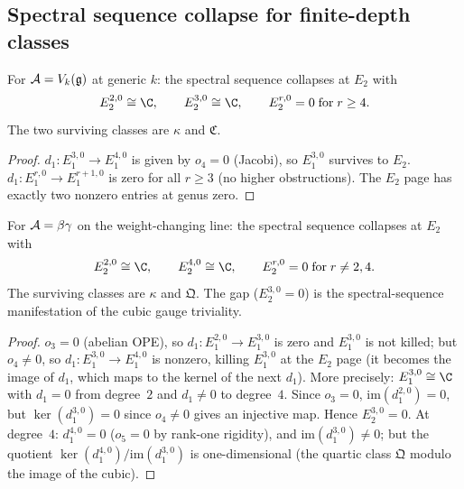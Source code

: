 
\subsection{Spectral sequence collapse for finite-depth classes}

\begin{proposition}
\ClaimStatusProvedHere
{}
For $\mathcal{A} = V_k(\mathfrak{g})$ at generic $k$:
the spectral sequence collapses at $E_2$ with
\begin{equation}%
E_2^{2,0} \cong \C,
\qquad
E_2^{3,0} \cong \C,
\qquad
E_2^{r,0} = 0 \;\text{for}\; r \geq 4.
\end{equation}
The two surviving classes are $\kappa$ and $\mathfrak{C}$.
\end{proposition}

\begin{proof}
$d_1\colon E_1^{3,0} \to E_1^{4,0}$ is given by $o_4 = 0$
(Jacobi), so $E_1^{3,0}$ survives to $E_2$.
$d_1\colon E_1^{r,0} \to E_1^{r+1,0}$ is zero for all
$r \geq 3$ (no higher obstructions). The $E_2$ page has
exactly two nonzero entries at genus zero.
\end{proof}

\begin{proposition}
\ClaimStatusProvedHere
{}
For $\mathcal{A} = \beta\gamma$ on the weight-changing line:
the spectral sequence collapses at $E_2$ with
\begin{equation}%
E_2^{2,0} \cong \C,
\qquad
E_2^{4,0} \cong \C,
\qquad
E_2^{r,0} = 0 \;\text{for}\; r \neq 2, 4.
\end{equation}
The surviving classes are $\kappa$ and $\mathfrak{Q}$.
The gap ($E_2^{3,0} = 0$) is the spectral-sequence
manifestation of the cubic gauge triviality.
\end{proposition}

\begin{proof}
$o_3 = 0$ (abelian OPE), so $d_1\colon E_1^{2,0} \to E_1^{3,0}$
is zero and $E_1^{3,0}$ is not killed; but $o_4 \neq 0$, so
$d_1\colon E_1^{3,0} \to E_1^{4,0}$ is nonzero, killing
$E_1^{3,0}$ at the $E_2$ page (it becomes the image of
$d_1$, which maps to the kernel of the next $d_1$).
More precisely: $E_1^{3,0} \cong \C$ with $d_1 = 0$ from
degree~$2$ and $d_1 \neq 0$ to degree~$4$. Since $o_3 = 0$,
$\mathrm{im}(d_1^{2,0}) = 0$, but
$\ker(d_1^{3,0}) = 0$ since $o_4 \neq 0$
gives an injective map. Hence $E_2^{3,0} = 0$.
At degree~$4$: $d_1^{4,0} = 0$ ($o_5 = 0$ by rank-one
rigidity), and $\mathrm{im}(d_1^{3,0}) \neq 0$; but the
quotient $\ker(d_1^{4,0})/\mathrm{im}(d_1^{3,0})$ is
one-dimensional (the quartic class $\mathfrak{Q}$ modulo
the image of the cubic).
\end{proof}


